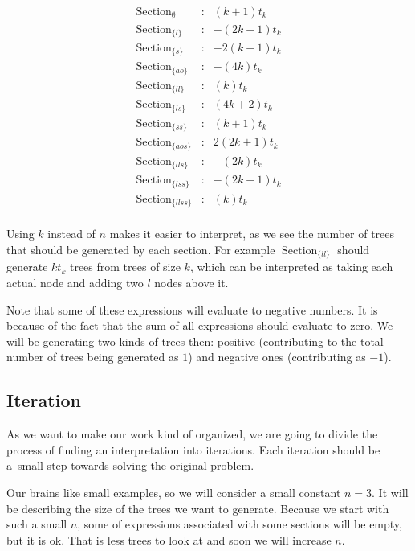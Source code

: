 \documentclass[final]{article}
\theoremstyle{definition}
\theoremstyle{definition}
\theoremstyle{remark}
\DeclareMathOperator{\tSection}{\text{Section}}
\begin{document}
\[\begin{array}{lcr}
        \tSection_{\emptyset} &:& (k + 1) t_k\\
        \tSection_{\{l\}} &:& - (2 k + 1) t_k\\
        \tSection_{\{s\}} &:& - 2 (k + 1) t_k\\
        \tSection_{\{ao\}} &:& - (4 k) t_k\\
        \tSection_{\{ll\}} &:& (k) t_k\\
        \tSection_{\{ls\}} &:& (4 k + 2) t_k\\
        \tSection_{\{ss\}} &:& (k + 1) t_k\\
        \tSection_{\{aos\}} &:& 2 (2 k + 1) t_k\\
        \tSection_{\{lls\}} &:& - (2 k) t_k\\
        \tSection_{\{lss\}} &:& - (2 k + 1) t_k\\
        \tSection_{\{llss\}} &:& (k) t_k\\
\end{array}\]

Using \(k\) instead of \(n\) makes it easier to interpret, as we see the number of trees that should be generated by each section. For example \(\tSection_{\{ll\}}\) should generate \(k t_k\) trees from trees of size \(k\), which can be interpreted as taking each actual node and adding two \(l\) nodes above it.

Note that some of these expressions will evaluate to negative numbers. It is because of the fact that the sum of all expressions should evaluate to zero. We will be generating two kinds of trees then: positive (contributing to the total number of trees being generated as \(1\)) and negative ones (contributing as \(-1\)).

\subsection{Iteration}%
\label{sub:iteration}

As we want to make our work kind of organized, we are going to divide the process of finding an interpretation into iterations. Each iteration should be a~small step towards solving the original problem.

Our brains like small examples, so we will consider a small constant \(n = 3\). It will be describing the size of the trees we want to generate. Because we start with such a small \(n\), some of expressions associated with some sections will be empty, but it is ok. That is less trees to look at and soon we will increase \(n\).
\end{document}
